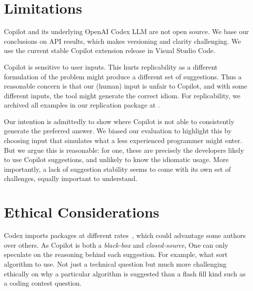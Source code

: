 \section{Limitations}
\label{limitations}
Copilot and its underlying OpenAI Codex LLM are not open source. 
We base our conclusions on API results, which makes versioning and clarity challenging. We use the current stable Copilot extension release in Visual Studio Code. %

Copilot is sensitive to user inputs. This hurts replicability as a different formulation of the problem might produce a different set of suggestions. 
Thus a reasonable concern is that our (human) input is unfair to Copilot, and with some different inputs, the tool might generate the correct idiom. 
For replicability, we archived all examples in our replication package at \repl{}.

Our intention is admittedly to show where Copilot is not able to consistently generate the preferred answer. We biased our evaluation to highlight this by choosing input that simulates what a less experienced programmer might enter. 
But we argue this is reasonable: for one, these are precisely the developers likely to use Copilot suggestions, and unlikely to know the idiomatic usage.
More importantly, a lack of suggestion stability seems to come with its own set of challenges, equally important to understand.%
%

\section{Ethical Considerations}
\label{ethics}
Codex imports packages at different rates~\cite{copilot}, which could advantage some authors over others. As Copilot is both a \emph{black-box} and \emph{closed-source}, One can only speculate on the reasoning behind each suggestion.  For example, what sort algorithm to use. Not just a technical question but much more challenging ethically on why a particular algorithm is suggested than a flash fill kind such as a coding contest question.